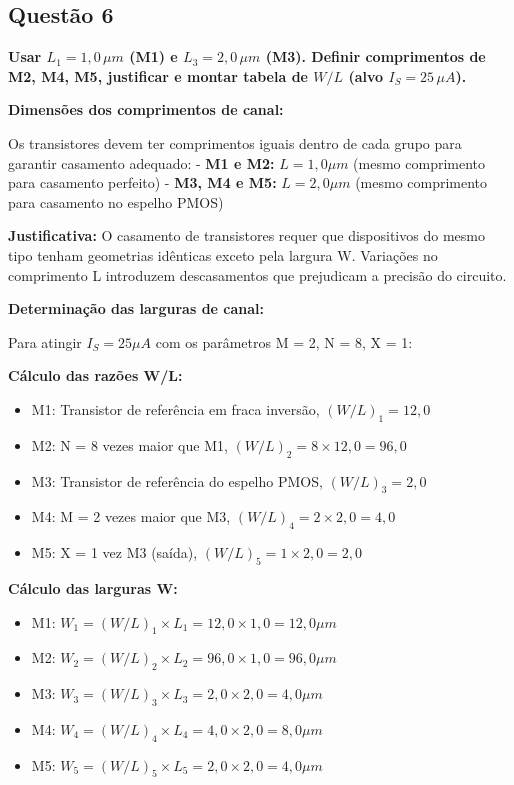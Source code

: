 \documentclass[12pt,a4paper]{article}
\begin{document}
\subsection*{Questão 6}
	\textbf{Usar $L_1 = 1,0\,\mu m$ (M1) e $L_3 = 2,0\,\mu m$ (M3). Definir comprimentos de M2, M4, M5, justificar e montar tabela de $W/L$ (alvo $I_S=25\,\mu A$).}

\t\textbf{Dimensões dos comprimentos de canal:}

Os transistores devem ter comprimentos iguais dentro de cada grupo para garantir casamento adequado:
- \t\textbf{M1 e M2:} $L = 1,0 \mu m$ (mesmo comprimento para casamento perfeito)
- \t\textbf{M3, M4 e M5:} $L = 2,0 \mu m$ (mesmo comprimento para casamento no espelho PMOS)

\t\textbf{Justificativa:} O casamento de transistores requer que dispositivos do mesmo tipo tenham geometrias idênticas exceto pela largura W. Variações no comprimento L introduzem descasamentos que prejudicam a precisão do circuito.

\t\textbf{Determinação das larguras de canal:}

Para atingir $I_S = 25 \mu A$ com os parâmetros M = 2, N = 8, X = 1:

\t\textbf{Cálculo das razões W/L:}
\begin{itemize}
    \item M1: Transistor de referência em fraca inversão, $(W/L)_1 = 12,0$
    \item M2: N = 8 vezes maior que M1, $(W/L)_2 = 8 \times 12,0 = 96,0$
    \item M3: Transistor de referência do espelho PMOS, $(W/L)_3 = 2,0$
    \item M4: M = 2 vezes maior que M3, $(W/L)_4 = 2 \times 2,0 = 4,0$
    \item M5: X = 1 vez M3 (saída), $(W/L)_5 = 1 \times 2,0 = 2,0$
\end{itemize}

\t\textbf{Cálculo das larguras W:}
\begin{itemize}
    \item M1: $W_1 = (W/L)_1 \times L_1 = 12,0 \times 1,0 = 12,0 \mu m$
    \item M2: $W_2 = (W/L)_2 \times L_2 = 96,0 \times 1,0 = 96,0 \mu m$
    \item M3: $W_3 = (W/L)_3 \times L_3 = 2,0 \times 2,0 = 4,0 \mu m$
    \item M4: $W_4 = (W/L)_4 \times L_4 = 4,0 \times 2,0 = 8,0 \mu m$
    \item M5: $W_5 = (W/L)_5 \times L_5 = 2,0 \times 2,0 = 4,0 \mu m$
\end{itemize}
\end{document}
